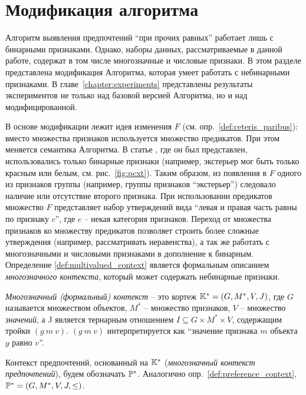 \chapter{Модификация алгоритма}
\label{chapter:modification}

Алгоритм выявления предпочтений \enquote{при прочих равных} работает лишь с бинарными признаками. Однако, наборы данных, рассматриваемые в данной работе, содержат в том числе многозначные и числовые признаки. В этом разделе представлена модификация Алгоритма, которая умеет работать с небинарными признаками. В главе~\ref{chapter:experiments} представлены результаты экспериментов не только над базовой версией Алгоритма, но и над модифицированной.

В основе модификации лежит идея изменения $F$ (см. опр.~\ref{def:ceteris_paribus}): вместо множества признаков используется множество предикатов. При этом меняется семантика Алгоритма. В статье \cite{Obiedkov:2013}, где он был представлен, использовались только бинарные признаки (например, экстерьер мог быть только красным или белым, см. рис.~\ref{fig:pcxt}). Таким образом, из появления в $F$ одного из признаков группы (например, группы признаков ``экстерьер'') следовало наличие или отсутствие второго признака. При использовании предикатов множество $F$ представляет набор утверждений вида ``левая и правая часть равны по признаку $c$'', где $c$ – некая категория признаков. Переход от множества признаков ко множеству предикатов позволяет строить более сложные утверждения (например, рассматривать неравенства), а так же работать с многозначными и числовыми признаками в дополнение к бинарным. Определение \ref{def:multivalued_context}\cite{Ganter:1997} является формальным описанием \emph{многозначного контекста}, который может содержать небинарные признаки.

\begin{definition}
\label{def:multivalued_context}
	\emph{Многозначный (формальный) контекст} – это кортеж $\mathbb{K}^* = (G, M^*, V, J)$, где $G$ называется множеством объектов, $M^*$ – множество признаков, $V$ – множество \emph{значений}, а J является тернарным отношением ${I \subseteq G \times M^* \times V}$, содержащим тройки $(g\:m\:v)$. $(g\:m\:v)$ интерпретируется как ``значение признака $m$ объекта $g$ равно $v$''. 
\end{definition}

Контекст предпочтений, основанный на $\mathbb{K}^*$ (\emph{многозначный контекст предпочтений}), будем обозначать $\mathbb{P}^*$. Аналогично опр.~\ref{def:preference_context}, $\mathbb{P}^* = (G, M^*, V, J, \leq)$.


